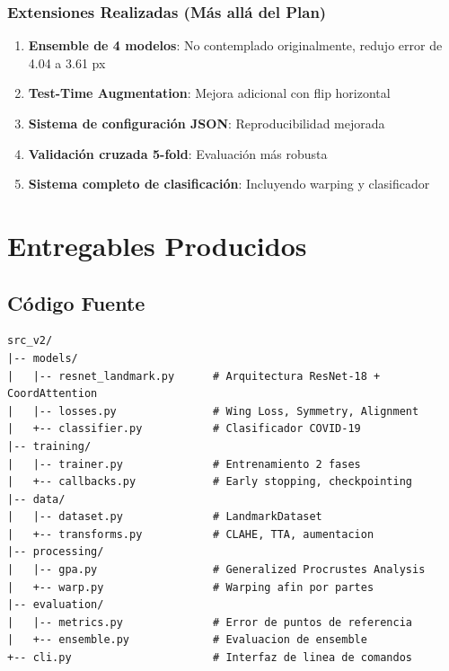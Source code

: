 \documentclass[12pt,a4paper]{article}
\begin{document}
\subsubsection{Extensiones Realizadas (Más allá del Plan)}

\begin{enumerate}
    \item \textbf{Ensemble de 4 modelos}: No contemplado originalmente, redujo error de 4.04 a 3.61 px
    \item \textbf{Test-Time Augmentation}: Mejora adicional con flip horizontal
    \item \textbf{Sistema de configuración JSON}: Reproducibilidad mejorada
    \item \textbf{Validación cruzada 5-fold}: Evaluación más robusta
    \item \textbf{Sistema completo de clasificación}: Incluyendo warping y clasificador
\end{enumerate}

\section{Entregables Producidos}

\subsection{Código Fuente}

\begin{lstlisting}[style=bashstyle,numbers=none]
src_v2/
|-- models/
|   |-- resnet_landmark.py      # Arquitectura ResNet-18 + CoordAttention
|   |-- losses.py               # Wing Loss, Symmetry, Alignment
|   +-- classifier.py           # Clasificador COVID-19
|-- training/
|   |-- trainer.py              # Entrenamiento 2 fases
|   +-- callbacks.py            # Early stopping, checkpointing
|-- data/
|   |-- dataset.py              # LandmarkDataset
|   +-- transforms.py           # CLAHE, TTA, aumentacion
|-- processing/
|   |-- gpa.py                  # Generalized Procrustes Analysis
|   +-- warp.py                 # Warping afin por partes
|-- evaluation/
|   |-- metrics.py              # Error de puntos de referencia
|   +-- ensemble.py             # Evaluacion de ensemble
+-- cli.py                      # Interfaz de linea de comandos
\end{lstlisting}
\end{document}
